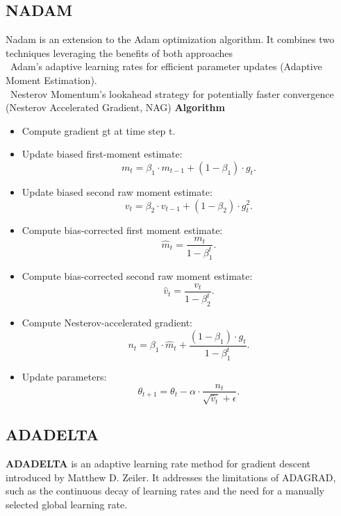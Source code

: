 \documentclass{ieeeojies}
\begin{document}
\subsection{NADAM} 
Nadam is an extension to the Adam optimization algorithm. It combines two techniques leveraging the benefits of both approaches \\
    \indent\textbullet\ Adam's adaptive learning rates for efficient parameter updates (Adaptive Moment Estimation). \\
    \indent\textbullet\ Nesterov Momentum's lookahead strategy for potentially faster convergence (Nesterov Accelerated Gradient, NAG)
\textbf{Algorithm}
\begin{itemize}
    \item Compute gradient gt at time step t. 
    \item Update biased first-moment estimate:
        \[m_t = \beta_1 \cdot m_{t-1} + (1 - \beta_1) \cdot g_t. \]
    \item Update biased second raw moment estimate:
        \[ v_t = \beta_2 \cdot v_{t-1} + (1 - \beta_2) \cdot g_t^2. \]
    \item Compute bias-corrected first moment estimate:
        \[\hat{m}_t = \frac{m_t}{1-\beta_1^t}.\]
    \item Compute bias-corrected second raw moment estimate:
        \[ \hat{v}_t = \frac{v_t}{1-\beta_2^t}.\]
    \item Compute Nesterov-accelerated gradient:
        \[ n_t = \beta_1 \cdot \hat{m}_t + \frac{(1-\beta_1) \cdot g_t}{1-\beta_1^t}.\]
    \item Update parameters:
        \[ \theta_{t+1} = \theta_t - \alpha \cdot \frac{n_t}{\sqrt{\hat{v}_t} + \epsilon}.\]
\end{itemize}
 
\subsection{ADADELTA}

\textbf{ADADELTA} is an adaptive learning rate method for gradient descent introduced by Matthew D. Zeiler. It addresses the limitations of ADAGRAD, such as the continuous decay of learning rates and the need for a manually selected global learning rate.
\end{document}

